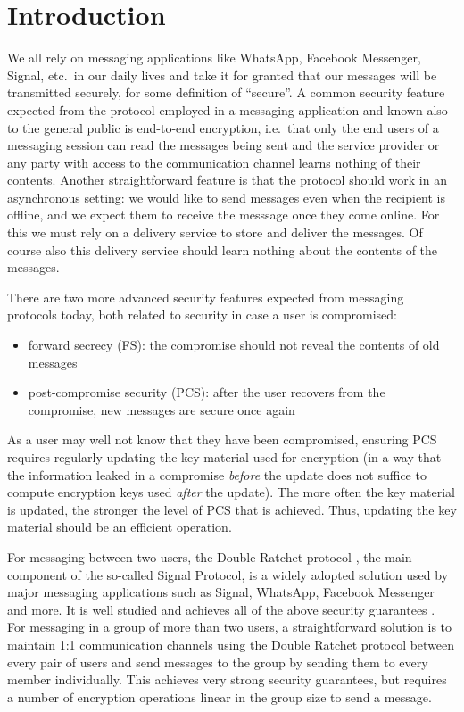 \chapter{Introduction}

We all rely on messaging applications like WhatsApp, Facebook Messenger, Signal, etc.\ in our daily lives and take it for granted that our messages will be transmitted securely, for some definition of ``secure''. A common security feature expected from the protocol employed in a messaging application and known also to the general public is end-to-end encryption, i.e.\ that only the end users of a messaging session can read the messages being sent and the service provider or any party with access to the communication channel learns nothing of their contents. Another straightforward feature is that the protocol should work in an asynchronous setting: we would like to send messages even when the recipient is offline, and we expect them to receive the messsage once they come online. For this we must rely on a delivery service to store and deliver the messages. Of course also this delivery service should learn nothing about the contents of the messages.

There are two more advanced security features expected from messaging protocols today, both related to security in case a user is compromised:
\begin{itemize}
	\item forward secrecy (FS): the compromise should not reveal the contents of old messages
	\item post-compromise security (PCS): after the user recovers from the compromise, new messages are secure once again
\end{itemize}
As a user may well not know that they have been compromised, ensuring PCS requires regularly updating the key material used for encryption (in a way that the information leaked in a compromise \emph{before} the update does not suffice to compute encryption keys used \emph{after} the update). The more often the key material is updated, the stronger the level of PCS that is achieved. Thus, updating the key material should be an efficient operation.

For messaging between two users, the Double Ratchet protocol \cite{double-ratchet}, the main component of the so-called Signal Protocol, is a widely adopted solution used by major messaging applications such as Signal, WhatsApp, Facebook Messenger and more. It is well studied and achieves all of the above security guarantees \cite{double-ratchet-analysis}. For messaging in a group of more than two users, a straightforward solution is to maintain 1:1 communication channels using the Double Ratchet protocol between every pair of users and send messages to the group by sending them to every member individually. This achieves very strong security guarantees, but requires a number of encryption operations linear in the group size to send a message.

